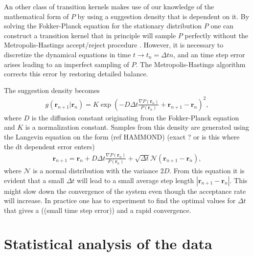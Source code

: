\documentclass[a4paper,10pt,twocolumn]{article} %
\newcommand{\ts}[1]{\textbf{#1}}
\begin{document}
%

An other class of transition kernels makes use of our knowledge of the mathematical form of $P$ by using a suggestion density that is dependent on it. 
By solving the Fokker-Planck equation for the stationary distribution $P$ one can construct a transition kernel that in principle will sample $P$ perfectly without the 
Metropolis-Hastings accept/reject procedure \cite{lars_eivind_thesis, scemama_2006}. However, it is necessary to discretize the 
dynamical equations in time $t\to t_n= \Delta t n$, and an time step error arises leading to an imperfect sampling of $P$. %
The Metropolis-Hastings algorithm corrects this error %
by restoring detailed balance.%

The suggestion density becomes \cite{lars_eivind_thesis}
\begin{align}
	g(\ts r_{n+1}|\ts r_n)=K\exp(-D\Delta t \frac{\nabla P(\ts r_n)}{P(\ts r_n)} + \ts r_{n+1}-\ts r_{n})^2,	
	\label{sugdeis}
\end{align}
where $D$ is the diffusion constant originating from the Fokker-Planck equation and $K$ is a normalization constant. 
Samples from this density are generated using the Langevin equation on the form (ref HAMMOND) (exact ? or is this where the dt dependent error enters)
\begin{align}
	\ts r_{n+1}=\ts r_n+D\Delta t \frac{\nabla P(\ts r_n)}{P(\ts r_n)} + \sqrt{\Delta t}\mathcal N(\ts r_{n+1}-\ts r_{n}),	
	\label{rp1}
\end{align}
where $\mathcal N$ is a normal distribution with the variance $2D$.
From this equation it is evident that a small $\Delta t$ will lead to a small average step length $|\ts r_{n+1}-\ts r_n|$. This might slow down the 
convergence of the system even though the acceptance rate will increase. %
In practice one has to experiment to find the optimal values for $\Delta t$ that gives a ((small time step error)) and a rapid convergence. 



\section{Statistical analysis of the data}%
\end{document}
